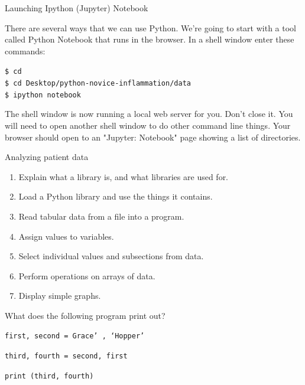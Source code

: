 \documentclass{beamer}
\begin{document}
\begin{frame}{Launching Ipython (Jupyter) Notebook}

\small{There are several ways that we can use Python.  We're going to start with
a tool called Python Notebook that runs in the browser.
In a shell window enter these commands:}

\vspace{0.5cm}

\begin{beamerboxesrounded}[upper=uppercolgreen,lower=lowercolgreen,shadow=false]{}
\texttt{\$ cd \\
\$ cd Desktop/python-novice-inflammation/data \\
\$ ipython notebook}
\end{beamerboxesrounded}
\vspace{0.5cm}

\small{The shell window is now running a local web server for you.  Don't close it. You will need to open another shell window to do other command line things. Your browser should open to an "Jupyter:  Notebook" page showing a list of directories.}
\end{frame}


\begin{frame}{Analyzing patient data}

\begin{enumerate}
    \item{Explain what a library is, and what libraries are used for.}
    \item{Load a Python library and use the things it contains.}
    \item{Read tabular data from a file into a program.}
    \item{Assign values to variables.}
    \item{Select individual values and subsections from data.}
    \item{Perform operations on arrays of data.}
    \item{Display simple graphs.}
\end{enumerate}
\end{frame}


\begin{frame}{ }
What does the following program print out?
\vspace{0.5cm}

\begin{beamerboxesrounded}[upper=uppercolgreen,lower=lowercolgreen,shadow=false]{}

\texttt{first, second = Grace' , `Hopper'}

\texttt{third, fourth = second, first}

\texttt{print (third, fourth)}

\end{beamerboxesrounded}

\end{frame}
\end{document}
